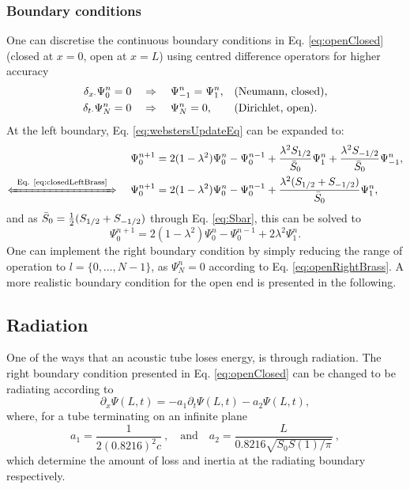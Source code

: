 \subsubsection{Boundary conditions}
One can discretise the continuous boundary conditions in Eq. \eqref{eq:openClosed} (closed at $x=0$, open at $x=L$) using centred difference operators for higher accuracy
\begin{subequations}\label{eq:discBoundariesBrass}
    \begin{align}
        \dxd\Psi_0^n &= 0 \quad \Rightarrow \quad\Psi_{-1}^n = \Psi_1^n ,\quad \!\!\!\!\!\!&&\text{(Neumann, closed)}, \label{eq:closedLeftBrass}\\
        \dtd\Psi_N^n &= 0\quad\Rightarrow \quad \Psi_N^n = 0, \quad \!\!\!\!\!\!&&\text{(Dirichlet, open)}\label{eq:openRightBrass}.
    \end{align}
\end{subequations} 
At the left boundary, Eq. \eqref{eq:webstersUpdateEq} can be expanded to:
\begin{equation*}
    \begin{aligned}
        \Psi_0^{n+1} &= 2(1-\lambda^2)\Psi_0^n-\Psi_0^{n-1}+ \frac{\lambda^2S_{1/2}}{\bar S_0}\Psi_1^n + \frac{\lambda^2S_{-1/2}}{\bar S_0}\Psi_{-1}^n,\\[-0.5em]
        \xLeftrightarrow{\mystrut\ \text{Eq. \eqref{eq:closedLeftBrass}}\ }\quad\Psi_0^{n+1} &= 2(1-\lambda^2)\Psi_0^n-\Psi_0^{n-1}+ \frac{\lambda^2(S_{1/2}+S_{-1/2})}{\bar S_0}\Psi_1^n,
    \end{aligned}
\end{equation*}
and as $\bar{S}_0 = \frac{1}{2}(S_{1/2}+S_{-1/2})$ through Eq. \eqref{eq:Sbar}, this can be solved to
\begin{equation}\label{eq:leftBoundaryWebster}
    \Psi_0^{n+1} = 2(1-\lambda^2)\Psi_0^n-\Psi_0^{n-1}+ 2\lambda^2\Psi_1^n.
\end{equation}
One can implement the right boundary condition by simply reducing the range of operation to $l = \{0, \hdots, N-1\}$, as $\Psi_N^n = 0$ according to Eq. \eqref{eq:openRightBrass}. A more realistic boundary condition for the open end is presented in the following.

\subsection{Radiation}\label{sec:radiating}
One of the ways that an acoustic tube loses energy, is through radiation. The right boundary condition presented in Eq. \eqref{eq:openClosed} can be changed to be radiating according to \cite{theBible}
\begin{equation}\label{eq:radCont}
    \partial_x\Psi(L,t) = -a_1\partial_t\Psi(L,t)-a_2\Psi(L,t),
\end{equation}
where, for a tube terminating on an infinite plane \cite{Atig2004}
\begin{equation}
    a_1 = \frac{1}{2(0.8216)^2c}\ , \quad \text{and} \quad a_2 = \frac{L}{0.8216\sqrt{S_0S(1)/\pi}}\ ,
\end{equation}
which determine the amount of loss and inertia at the radiating boundary respectively. 


